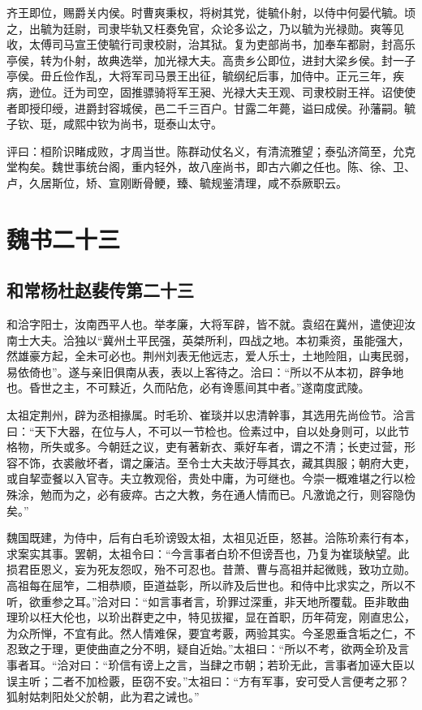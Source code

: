 \documentclass[12pt,UTF8]{ctexbook}
\begin{document}
齐王即位，赐爵关内侯。时曹爽秉权，将树其党，徙毓仆射，以侍中何晏代毓。顷之，出毓为廷尉，司隶毕轨又枉奏免官，众论多讼之，乃以毓为光禄勋。爽等见收，太傅司马宣王使毓行司隶校尉，治其狱。复为吏部尚书，加奉车都尉，封高乐亭侯，转为仆射，故典选举，加光禄大夫。高贵乡公即位，进封大梁乡侯。封一子亭侯。毌丘俭作乱，大将军司马景王出征，毓纲纪后事，加侍中。正元三年，疾病，逊位。迁为司空，固推骠骑将军王昶、光禄大夫王观、司隶校尉王祥。诏使使者即授印绶，进爵封容城侯，邑二千三百户。甘露二年薨，谥曰成侯。孙藩嗣。毓子钦、珽，咸熙中钦为尚书，珽泰山太守。

评曰：桓阶识睹成败，才周当世。陈群动仗名义，有清流雅望；泰弘济简至，允克堂构矣。魏世事统台阁，重内轻外，故八座尚书，即古六卿之任也。陈、徐、卫、卢，久居斯位，矫、宣刚断骨鲠，臻、毓规鉴清理，咸不忝厥职云。

\part{魏书二十三}
\chapter{和常杨杜赵裴传第二十三}

和洽字阳士，汝南西平人也。举孝廉，大将军辟，皆不就。袁绍在冀州，遣使迎汝南士大夫。洽独以“冀州土平民强，英桀所利，四战之地。本初乘资，虽能强大，然雄豪方起，全未可必也。荆州刘表无他远志，爱人乐士，土地险阻，山夷民弱，易依倚也”。遂与亲旧俱南从表，表以上客待之。洽曰：“所以不从本初，辟争地也。昏世之主，不可黩近，久而阽危，必有谗慝间其中者。”遂南度武陵。

太祖定荆州，辟为丞相掾属。时毛玠、崔琰并以忠清幹事，其选用先尚俭节。洽言曰：“天下大器，在位与人，不可以一节检也。俭素过中，自以处身则可，以此节格物，所失或多。今朝廷之议，吏有著新衣、乘好车者，谓之不清；长吏过营，形容不饰，衣裘敝坏者，谓之廉洁。至令士大夫故汙辱其衣，藏其舆服；朝府大吏，或自挈壶餐以入官寺。夫立教观俗，贵处中庸，为可继也。今崇一概难堪之行以检殊涂，勉而为之，必有疲瘁。古之大教，务在通人情而已。凡激诡之行，则容隐伪矣。”

魏国既建，为侍中，后有白毛玠谤毁太祖，太祖见近臣，怒甚。洽陈玠素行有本，求案实其事。罢朝，太祖令曰：“今言事者白玠不但谤吾也，乃复为崔琰觖望。此损君臣恩义，妄为死友怨叹，殆不可忍也。昔萧、曹与高祖并起微贱，致功立勋。高祖每在屈笮，二相恭顺，臣道益彰，所以祚及后世也。和侍中比求实之，所以不听，欲重参之耳。”洽对曰：“如言事者言，玠罪过深重，非天地所覆载。臣非敢曲理玠以枉大伦也，以玠出群吏之中，特见拔擢，显在首职，历年荷宠，刚直忠公，为众所惮，不宜有此。然人情难保，要宜考覈，两验其实。今圣恩垂含垢之仁，不忍致之于理，更使曲直之分不明，疑自近始。”太祖曰：“所以不考，欲两全玠及言事者耳。“洽对曰：“玠信有谤上之言，当肆之巿朝；若玠无此，言事者加诬大臣以误主听；二者不加检覈，臣窃不安。”太祖曰：“方有军事，安可受人言便考之邪？狐射姑刺阳处父於朝，此为君之诫也。”
\end{document}
